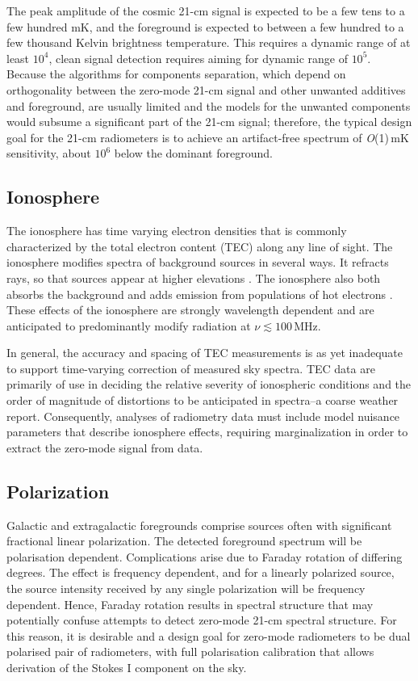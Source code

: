 The peak amplitude of the cosmic 21-cm signal is expected to be a few tens to a few hundred mK, and the foreground is expected to between a few hundred to a few thousand Kelvin brightness temperature.  This requires a dynamic range of at least $10^4$, clean signal detection requires aiming for dynamic range of $10^5$.  Because the algorithms for components separation, which depend on orthogonality between the zero-mode 21-cm signal and other unwanted additives and foreground, are usually limited and the models for the unwanted components would subsume a significant part of the 21-cm signal; therefore, the typical design goal for the 21-cm radiometers is to achieve an artifact-free spectrum of {\it O}(1)\,mK sensitivity, about $10^6$ below the dominant foreground.

\subsection{Ionosphere}

The ionosphere has time varying electron densities that is commonly characterized by the total electron content (TEC) along any line of sight.  The ionosphere modifies spectra of background sources in several ways.  It refracts rays, so that sources appear at higher elevations \cite{vedantham14}.  The ionosphere also both absorbs the background and adds emission from populations of hot electrons \cite{rogers15}. These effects of the ionosphere are strongly wavelength dependent and are anticipated to predominantly modify radiation at $\nu\lesssim 100$\,MHz.

In general, the accuracy and spacing of TEC measurements is as yet inadequate to support time-varying correction of measured sky spectra.  TEC data are primarily of use in deciding the relative severity of ionospheric conditions and the order of magnitude of distortions to be anticipated in spectra--a coarse weather report.  Consequently, analyses of radiometry data  must include model nuisance parameters that describe ionosphere effects, requiring marginalization in order to extract the zero-mode signal from data.  

\subsection{Polarization}

Galactic and extragalactic foregrounds comprise sources often with significant fractional  linear polarization.  The detected foreground spectrum will be polarisation dependent.  Complications arise due to Faraday rotation of differing degrees.  The effect is frequency  dependent, and for a linearly polarized source, the source intensity received by any single polarization will be frequency dependent.  Hence, Faraday rotation results in spectral structure that may potentially confuse attempts to detect zero-mode 21-cm spectral structure. For this reason, it is desirable and a design goal for zero-mode radiometers to be dual polarised pair of radiometers, with full polarisation calibration that allows derivation of the Stokes I component on the sky.


